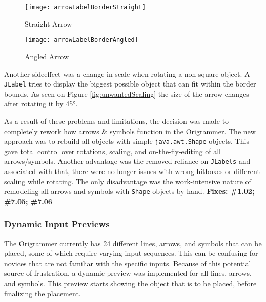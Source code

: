 \begin{figure*}[htbp]
	\centering
	\begin{subfigure}{0.3\textwidth}
		\texttt{[image: arrowLabelBorderStraight]}
		\caption{Straight Arrow}
		\label{fig:arrowLabelBorderStraight}
	\end{subfigure}
	\begin{subfigure}{0.3\textwidth}
		\texttt{[image: arrowLabelBorderAngled]}
		\caption{Angled Arrow}
		\label{fig:arrowLabelBorderAngled}
	\end{subfigure}
	\caption{Unwanted scaling when rotating\\ the wrong, always square hitbox, regardless of arrow shape}
	\label{fig:unwantedScaling}
\end{figure*}

\noindent Another sideeffect was a change in scale when rotating a non square object. A \texttt{JLabel} tries to display the biggest possible object that can fit within the border bounds. As seen on Figure \ref{fig:unwantedScaling} the size of the arrow changes after rotating it by 45°.

As a result of these problems and limitations, the decision was made to completely rework how arrows \& symbols function in the Origrammer. The new approach was to rebuild all objects with simple \texttt{java.awt.Shape}-objects. This gave total control over rotations, scaling, and on-the-fly-editing of all arrows/symbols. Another advantage was the removed reliance on \texttt{JLabels} and associated with that, there were no longer issues with wrong hitboxes or different scaling while rotating. The only disadvantage was the work-intensive nature of remodeling all arrows and symbols with \texttt{Shape}-objects by hand.
\newline
\textbf{Fixes: \#1.02; \#7.05; \#7.06}

\subsubsection{Dynamic Input Previews}

The Origrammer currently has 24 different lines, arrows, and symbols that can be placed, some of which require varying input sequences. This can be confusing for novices that are not familiar with the specific inputs. Because of this potential source of frustration, a dynamic preview was implemented for all lines, arrows, and symbols. This preview starts showing the object that is to be placed, before finalizing the placement.

